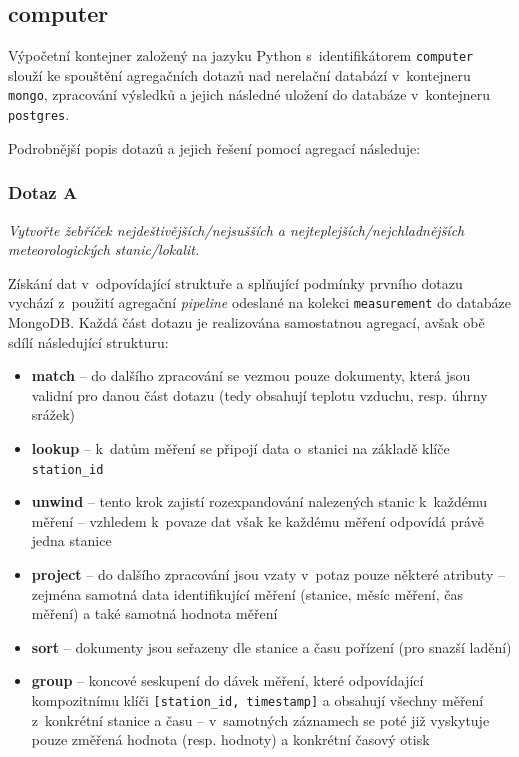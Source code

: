 \documentclass[10pt,a4paper,titlepage]{extarticle}
\begin{document}
    \subsection{computer}

    Výpočetní kontejner založený na jazyku Python s~identifikátorem \texttt{computer} slouží ke spouštění agregačních
    dotazů nad nerelační databází v~kontejneru \texttt{mongo}, zpracování výsledků a jejich následné uložení do databáze
    v~kontejneru \texttt{postgres}.

    Podrobnější popis dotazů a jejich řešení pomocí agregací následuje:

    \subsubsection{Dotaz A}
    \emph{Vytvořte žebříček nejdeštivějších/nejsušších a nejteplejších/nejchladnějších meteorologických stanic/lokalit.}

    Získání dat v~odpovídající struktuře a splňující podmínky prvního dotazu vychází z~použití agregační \emph{pipeline}
    odeslané na kolekci \texttt{measurement} do databáze MongoDB. Každá část dotazu je realizována samostatnou
    agregací, avšak obě sdílí následující strukturu:
    \begin{itemize}
        \item \textbf{{\textdollar}match} -- do dalšího zpracování se vezmou pouze dokumenty, která jsou validní pro
        danou část dotazu (tedy obsahují teplotu vzduchu, resp. úhrny srážek)
        \item \textbf{{\textdollar}lookup} -- k~datům měření se připojí data o~stanici na základě klíče \texttt{station\_id}
        \item \textbf{{\textdollar}unwind} -- tento krok zajistí rozexpandování nalezených stanic k~každému měření --
        vzhledem k~povaze dat však ke každému měření odpovídá právě jedna stanice
        \item \textbf{{\textdollar}project} -- do dalšího zpracování jsou vzaty v~potaz pouze některé
        atributy -- zejména samotná data identifikující měření (stanice, měsíc měření, čas měření) a také samotná
        hodnota měření
        \item \textbf{{\textdollar}sort} -- dokumenty jsou seřazeny dle stanice a času pořízení (pro snazší ladění)
        \item \textbf{{\textdollar}group} -- koncové seskupení do dávek měření, které odpovídající kompozitnímu klíči
        \texttt{[station\_id, timestamp]} a obsahují všechny měření z~konkrétní stanice a času --
v~samotných záznamech se poté již vyskytuje pouze změřená hodnota (resp. hodnoty) a konkrétní časový otisk
    \end{itemize}
    
\end{document}
